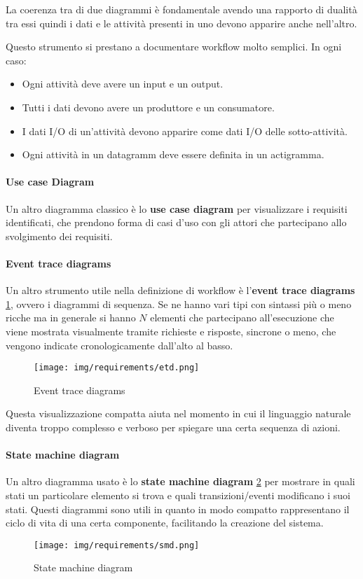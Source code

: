 La coerenza tra di due diagrammi è fondamentale avendo una rapporto di dualità
tra essi quindi i dati e le attività presenti in uno devono apparire anche nell'altro.

Questo strumento si prestano a documentare workflow molto semplici. In ogni caso:
\begin{itemize}
    \item Ogni attività deve avere un input e un output.
    \item Tutti i dati devono avere un produttore e un consumatore.
    \item I dati I/O di un'attività devono apparire come dati I/O delle sotto-attività.
    \item Ogni attività in un datagramm deve essere definita in un actigramma.
\end{itemize}
\paragraph{Use case Diagram}
Un altro diagramma classico è lo \textbf{use case diagram} per visualizzare i
requisiti identificati, che prendono forma di casi d'uso con gli attori che partecipano
allo svolgimento dei requisiti.
\paragraph{Event trace diagrams}
Un altro strumento utile nella definizione di workflow è l'\textbf{event trace diagrams}
\ref{fig:etd}, ovvero i diagrammi di sequenza. Se ne hanno vari tipi con sintassi
più o meno ricche ma in generale si hanno $N$ elementi che partecipano all'esecuzione
che viene mostrata visualmente tramite richieste e risposte, sincrone o meno,
che vengono indicate cronologicamente dall'alto al basso.
\begin{figure}[!ht]
    \centering
    \texttt{[image: img/requirements/etd.png]}
    \caption{Event trace diagrams}
    \label{fig:etd}
\end{figure}
Questa visualizzazione compatta aiuta nel momento in cui il linguaggio naturale
diventa troppo complesso e verboso per spiegare una certa sequenza di azioni.
\paragraph{State machine diagram}
Un altro diagramma usato è lo \textbf{state machine diagram} \ref{fig:smd} per
mostrare in quali stati un particolare elemento si trova e quali transizioni/eventi
modificano i suoi stati. Questi diagrammi sono utili in quanto in modo compatto
rappresentano il ciclo di vita di una certa componente, facilitando la creazione
del sistema.
\begin{figure}[!ht]
    \centering
    \texttt{[image: img/requirements/smd.png]}
    \caption{State machine diagram}
    \label{fig:smd}
\end{figure}

